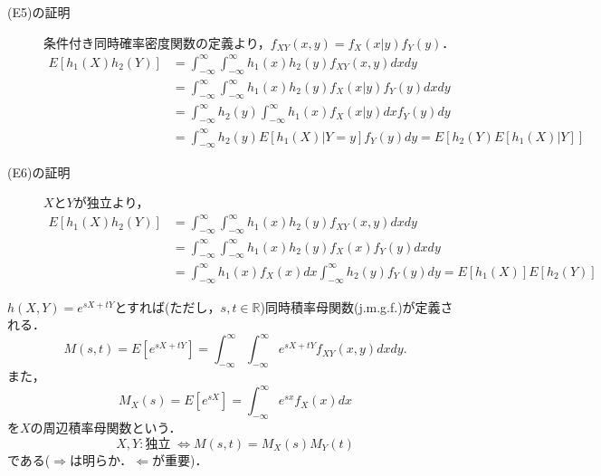 \documentclass{jsreport}
\begin{document}
\begin{description}
  \item[(E5)の証明]
  条件付き同時確率密度関数の定義より，$f_{XY}(x, y) = f_{X}(x | y)f_{Y}(y)$．
  \begin{align}
    E[h_1(X)h_2(Y)] &= \int_{-\infty}^{\infty} \int_{-\infty}^{\infty} h_1(x)h_2(y) f_{XY}(x, y) dxdy \nonumber \\
    &= \int_{-\infty}^{\infty} \int_{-\infty}^{\infty} h_1(x)h_2(y) f_{X}(x | y)f_{Y}(y) dx dy \nonumber \\
    &= \int_{-\infty}^{\infty} h_2(y) \int_{-\infty}^{\infty} h_1(x) f_{X}(x | y) dx f_{Y}(y) dy \nonumber \\
    &= \int_{-\infty}^{\infty} h_2(y) E[h_1(X) | Y = y] f_Y(y) dy = E[h_2(Y)E[h_1(X)|Y]] \nonumber
  \end{align}
  \item[(E6)の証明]
  $X$と$Y$が独立より，
  \begin{align}
    E[h_1(X)h_2(Y)] &= \int_{-\infty}^{\infty} \int_{-\infty}^{\infty} h_1(x)h_2(y) f_{XY}(x, y) dxdy \nonumber \\
    &= \int_{-\infty}^{\infty} \int_{-\infty}^{\infty} h_1(x)h_2(y) f_X(x) f_Y(y) dxdy \nonumber \\
    &= \int_{-\infty}^{\infty} h_1(x) f_X(x) dx \int_{-\infty}^{\infty}h_2(y)f_Y(y) dy = E[h_1(X)] E[h_2(Y)] \nonumber
  \end{align}
\end{description}

$h(X, Y) = e^{sX + tY}$とすれば(ただし，$s, t \in \mathbb{R}$)同時積率母関数(j.m.g.f.)が定義される．
\begin{equation}
  M(s, t) = E[e^{sX + tY}] = \int_{-\infty}^{\infty} \int_{-\infty}^{\infty} e^{sX + tY} f_{XY}(x, y) dx dy. \nonumber
\end{equation}
また，
\begin{equation}
  M_X(s) = E[e^{sX}] = \int_{-\infty}^{\infty} e^{sx}  f_X(x) dx \nonumber
\end{equation}
を$X$の周辺積率母関数という．
\begin{equation}
  X, Y: 独立 \; \Longleftrightarrow M(s, t) = M_X(s) M_Y(t) \nonumber
\end{equation}
である($\Longrightarrow$は明らか．$\Longleftarrow$が重要)．
\end{document}
